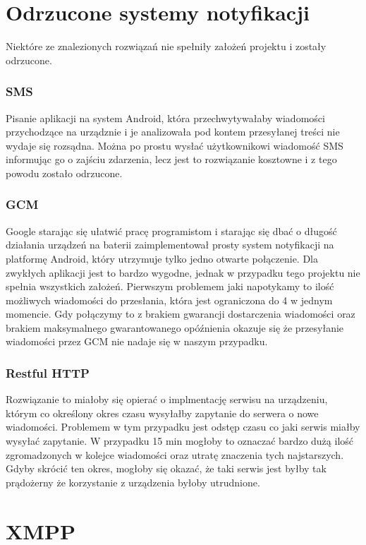 \documentclass[twoside]{article}
\begin{document}
\begin{multicols}{2}
\section{Odrzucone systemy notyfikacji}
Niektóre ze znalezionych rozwiązań nie spełniły założeń projektu i zostały odrzucone.
\subsubsection{SMS}
Pisanie aplikacji na system Android, która przechwytywałaby wiadomości przychodzące na urządznie i je analizowała pod kontem przesyłanej treści nie wydaje się rozsądna. Można po prostu wysłać użytkownikowi wiadomość SMS informując go o zajściu zdarzenia, lecz jest to rozwiązanie kosztowne i z tego powodu zostało odrzucone.

\subsubsection{GCM}
Google starając się ułatwić pracę programistom i starając się dbać o długość działania urządzeń na baterii zaimplementował prosty system notyfikacji na platformę Android, który utrzymuje tylko jedno otwarte połączenie. Dla zwykłych aplikacji jest to bardzo wygodne, jednak w przypadku tego projektu nie spełnia wszystkich założeń. Pierwszym problemem jaki napotykamy to ilość możliwych wiadomości do przesłania, która jest ograniczona do 4 w jednym momencie. Gdy połączymy to z brakiem gwarancji dostarczenia wiadomości oraz brakiem maksymalnego gwarantowanego opóźnienia okazuje się że przesyłanie wiadomości przez GCM nie nadaje się w naszym przypadku.

\subsubsection{Restful HTTP}
Rozwiązanie to miałoby się opierać o implmentację serwisu na urządzeniu, którym co określony okres czasu wysyłałby zapytanie do serwera o nowe wiadomości. Problemem w tym przypadku jest odstęp czasu co jaki serwis miałby wysyłać zapytanie. W przypadku 15 min mogłoby to oznaczać bardzo dużą ilość zgromadzonych w kolejce wiadomości oraz utratę znaczenia tych najstarszych. Gdyby skrócić ten okres, mogłoby się okazać, że taki serwis jest byłby tak prądożerny że korzystanie z urządzenia byłoby utrudnione.


\section{XMPP}


\end{multicols}
\end{document}
